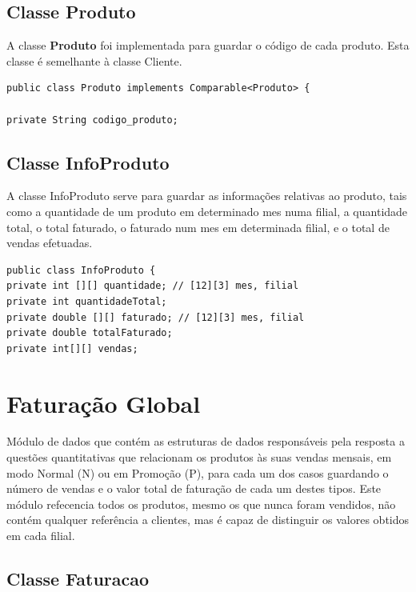 \subsection{Classe Produto}

A classe \color{blue} \textbf{Produto} \color{black} foi implementada para guardar o código de cada produto. Esta classe é semelhante à classe Cliente. 


\begin{verbatim}
public class Produto implements Comparable<Produto> {

private String codigo_produto;
\end{verbatim}


\subsection{Classe InfoProduto}
A classe InfoProduto serve para guardar as informações relativas ao produto, tais como a quantidade de um produto em determinado mes numa filial, a quantidade total, o total faturado, o faturado num mes em determinada filial, e o total de vendas efetuadas.  

\begin{verbatim}
public class InfoProduto {
private int [][] quantidade; // [12][3] mes, filial
private int quantidadeTotal;
private double [][] faturado; // [12][3] mes, filial
private double totalFaturado;
private int[][] vendas;
\end{verbatim}







\section{Faturação Global}

Módulo de dados que contém as estruturas de dados responsáveis pela resposta a questões quantitativas que relacionam os produtos às suas vendas mensais, em modo Normal (N) ou em Promoção (P), para cada um dos casos guardando o número de vendas e o valor total de faturação de cada um destes tipos. Este módulo refecencia todos os produtos, mesmo os que nunca foram vendidos, não contém qualquer referência a clientes, mas é capaz de distinguir os valores obtidos em cada filial. 

\subsection{Classe Faturacao}

